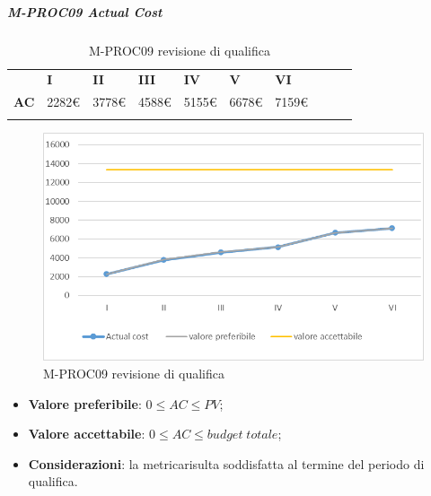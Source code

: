 \subparagraph{M-PROC09 Actual Cost} \mbox{}
\begin{longtable}[H!] {						
		>{}p{35mm}  		
		>{}p{12mm}
		>{}p{12mm}		
		>{}p{12mm}		
		>{}p{12mm}		
		>{}p{12mm}		
		>{}p{12mm}
		>{}p{12mm}
		>{}p{12mm}
		>{}p{12mm}
	}
	\rowcolor{gray!50}
	\textbf{} & \textbf{I} & \textbf{II} & \textbf{III} & \textbf{IV} & \textbf{V} & \textbf{VI} \TBstrut \\ [2mm]
	\textbf{AC} & 2282\euro & 3778\euro & 4588\euro & 5155\euro & 6678\euro & 7159\euro \TBstrut \\ [2mm]
	\rowcolor{white}
	\caption{M-PROC09 revisione di qualifica}
\end{longtable}
\begin{figure}[H] 	
	\includegraphics[width=\linewidth]{./img/grafici/RQ9.png}	
	\caption{M-PROC09 revisione di qualifica}	
\end{figure}
\begin{itemize}
	\item \textbf{Valore preferibile}: $0\le AC \le PV$;
	\item \textbf{Valore accettabile}: $0 \le AC \le budget \; totale$;
	\item \textbf{Considerazioni}: la metrica\glosp risulta soddisfatta al termine del periodo di qualifica.
\end{itemize}

